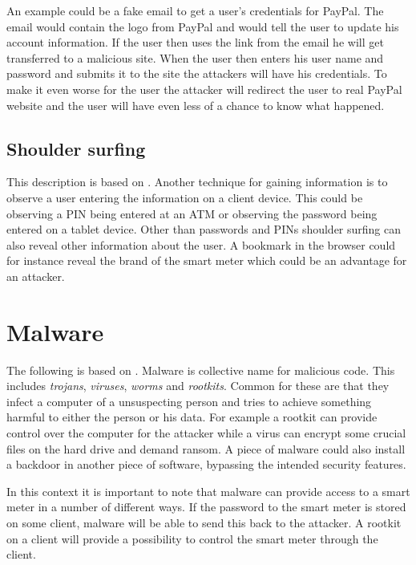 An example could be a fake email to get a user's credentials for PayPal.
The email would contain the logo from PayPal and would tell the user to update his account information.
If the user then uses the link from the email he will get transferred to a malicious site.
When the user then enters his user name and password and submits it to the site the attackers will have his credentials.
To make it even worse for the user the attacker will redirect the user to real PayPal website and the user will have even less of a chance to know what happened.

\subsection{Shoulder surfing}
This description is based on \citet{notechhack}.
Another technique for gaining information is to observe a user entering the information on a client device. 
This could be observing a PIN being entered at an ATM or observing the password being entered on a tablet device.
Other than passwords and PINs shoulder surfing can also reveal other information about the user.
A bookmark in the browser could for instance reveal the brand of the smart meter which could be an advantage for an attacker.

\section{Malware}
The following is based on \citet[p.~644]{security_engineering_ross_anderson}.
Malware is collective name for malicious code. 
This includes \emph{trojans}, \emph{viruses}, \emph{worms} and \emph{rootkits}.
Common for these are that they infect a computer of a unsuspecting person and tries to achieve something harmful to either the person or his data.
For example a rootkit can provide control over the computer for the attacker while a virus can encrypt some crucial files on the hard drive and demand ransom.
A piece of malware could also install a backdoor in another piece of software, bypassing the intended security features.

In this context it is important to note that malware can provide access to a smart meter in a number of different ways.
If the password to the smart meter is stored on some client, malware will be able to send this back to the attacker.
A rootkit on a client will provide a possibility to control the smart meter through the client.

